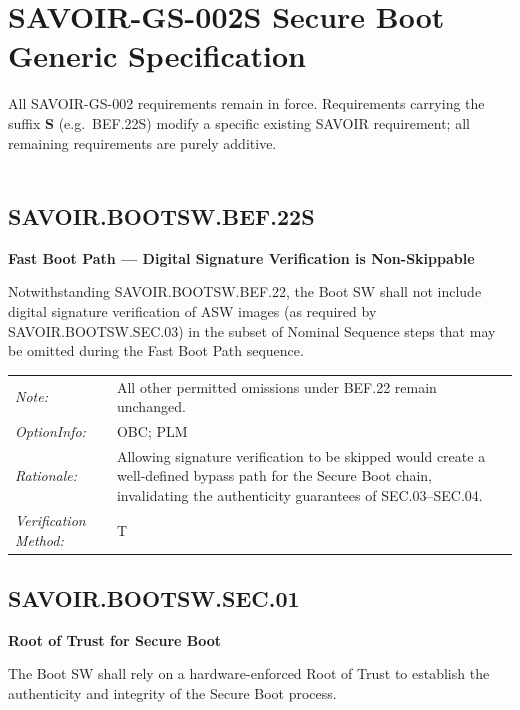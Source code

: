\chapter{SAVOIR-GS-002S Secure Boot Generic Specification}
\label{appendix:savoir-secure-boot}

All SAVOIR-GS-002 \cite{SAVOIR} requirements remain in force. Requirements carrying the suffix \textbf{S} (e.g.\ BEF.22S) modify a specific existing SAVOIR requirement; all remaining requirements are purely additive. \\\\

\headrule

\section*{SAVOIR.BOOTSW.BEF.22S}

\textbf{Fast Boot Path — Digital Signature Verification is Non-Skippable}

Notwithstanding SAVOIR.BOOTSW.BEF.22, the Boot SW shall not include digital signature verification of ASW images (as required by SAVOIR.BOOTSW.SEC.03) in the subset of Nominal Sequence steps that may be omitted during the Fast Boot Path sequence.

\vspace{6pt}

\begin{tabularx}{\textwidth}{@{}lX@{}}
\textit{Note:} & All other permitted omissions under BEF.22 remain unchanged. \\[6pt]
\textit{OptionInfo:} & OBC; PLM \\[6pt]
\textit{Rationale:} & Allowing signature verification to be skipped would create a well-defined bypass path for the Secure Boot chain, invalidating the authenticity guarantees of SEC.03--SEC.04. \\[6pt]
\textit{Verification Method:} & T \\[6pt]
\end{tabularx}

\headrule

\section*{SAVOIR.BOOTSW.SEC.01}

\textbf{Root of Trust for Secure Boot}

The Boot SW shall rely on a hardware-enforced Root of Trust to establish the authenticity and integrity of the Secure Boot process.

